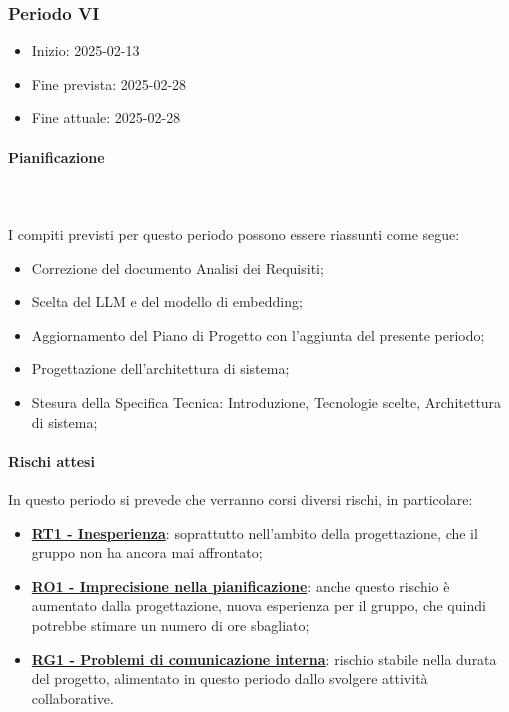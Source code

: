 \subsubsection{Periodo VI}

\begin{itemize}
    \item Inizio: 2025-02-13
    \item Fine prevista: 2025-02-28
    \item Fine attuale: 2025-02-28
\end{itemize}
\paragraph{Pianificazione} \hspace{1cm}
\\ \hspace{1cm} \\

I compiti previsti per questo periodo possono essere riassunti come segue:  
\begin{itemize}
    \item Correzione del documento Analisi dei Requisiti;
    \item Scelta del LLM e del modello di embedding;
    \item Aggiornamento del Piano di Progetto con l'aggiunta del presente periodo;
    \item Progettazione dell'architettura di sistema;
    \item Stesura della Specifica Tecnica: Introduzione, Tecnologie scelte, Architettura di sistema;
 
\end{itemize}

\paragraph{Rischi attesi}  
In questo periodo si prevede che verranno corsi diversi rischi, in particolare:
\begin{itemize}
    \item \textbf{\hyperlink{RT1}{RT1 - Inesperienza}}: soprattutto nell'ambito della progettazione, che il gruppo non ha ancora mai affrontato;
    \item \textbf{\hyperlink{RO1}{RO1 - Imprecisione nella pianificazione}}: anche questo rischio è aumentato dalla progettazione, nuova esperienza per il gruppo, che quindi potrebbe stimare un numero di ore sbagliato;
    \item \textbf{\hyperlink{RG1}{RG1 - Problemi di comunicazione interna}}: rischio stabile nella durata del progetto, alimentato in questo periodo dallo svolgere attività collaborative.
   
\end{itemize}

